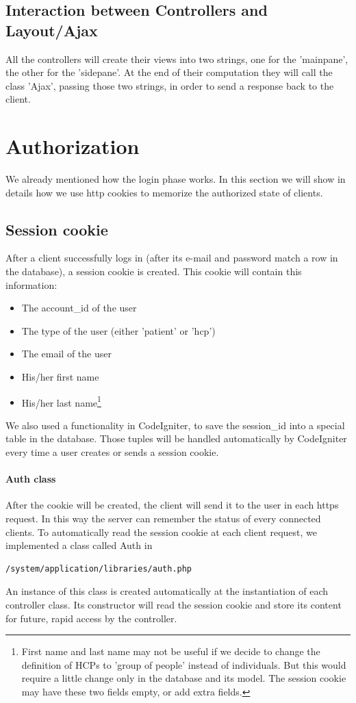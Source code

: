 \documentclass[10pt]{report}
\begin{document}
\subsection{Interaction between Controllers and Layout/Ajax}
All the controllers will create their views into two strings, one for the 'mainpane', the other for the 'sidepane'. At the end of their computation they will call the class 'Ajax', passing those two strings, in order to send a response back to the client.


\section{Authorization}
We already mentioned how the login phase works. In this section we will show in details how we use http cookies to memorize the authorized state of clients.
\subsection{Session cookie}
After a client successfully logs in (after its e-mail and password match a row in the database), a session cookie is created. This cookie will contain this information:
\begin{itemize}
\item The account\_id of the user
\item The type of the user (either 'patient' or 'hcp')
\item The email of the user
\item His/her first name
\item His/her last name\footnote{First name and last name may not be useful if we decide to change the definition of HCPs to 'group of people' instead of individuals. But this would require a little change only in the database and its model. The session cookie may have these two fields empty, or add extra fields.}
\end{itemize}
We also used a functionality in CodeIgniter, to save the session\_id into a special table in the database. Those tuples will be handled automatically by CodeIgniter every time a user creates or sends a session cookie.

\paragraph{Auth class}
After the cookie will be created, the client will send it to the user in each https request. In this way the server can remember the status of every connected clients. To automatically read the session cookie at each client request, we implemented a class called Auth in
\begin{verbatim}
/system/application/libraries/auth.php
\end{verbatim}
An instance of this class is created automatically at the instantiation of each controller class. Its constructor will read the session cookie and store its content for future, rapid access by the controller.
\end{document}
